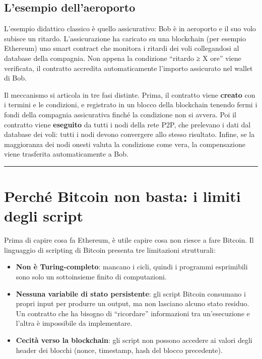 \documentclass[
  italian,
  openany]{book}
\providecommand{\tightlist}{%
  \setlength{\itemsep}{0pt}\setlength{\parskip}{0pt}}
\begin{document}
\subsection{L'esempio dell'aeroporto}\label{lesempio-dellaeroporto}

L'esempio didattico classico è quello assicurativo: Bob è in aeroporto e
il suo volo subisce un ritardo. L'assicurazione ha caricato su una
blockchain (per esempio Ethereum) uno smart contract che monitora i
ritardi dei voli collegandosi al database della compagnia. Non appena la
condizione ``ritardo ≥ X ore'' viene verificata, il contratto accredita
automaticamente l'importo assicurato nel wallet di Bob.

Il meccanismo si articola in tre fasi distinte. Prima, il contratto
viene \textbf{creato} con i termini e le condizioni, e registrato in un
blocco della blockchain tenendo fermi i fondi della compagnia
assicurativa finché la condizione non si avvera. Poi il contratto viene
\textbf{eseguito} da tutti i nodi della rete P2P, che prelevano i dati
dal database dei voli: tutti i nodi devono convergere allo stesso
risultato. Infine, se la maggioranza dei nodi onesti valuta la
condizione come vera, la compensazione viene trasferita automaticamente
a Bob.

\begin{center}\rule{0.5\linewidth}{0.5pt}\end{center}

\section{Perché Bitcoin non basta: i limiti degli
script}\label{perchuxe9-bitcoin-non-basta-i-limiti-degli-script}

Prima di capire cosa fa Ethereum, è utile capire cosa non riesce a fare
Bitcoin. Il linguaggio di scripting di Bitcoin presenta tre limitazioni
strutturali:

\begin{itemize}
\tightlist
\item
  \textbf{Non è Turing-completo}: mancano i cicli, quindi i programmi
  esprimibili sono solo un sottoinsieme finito di computazioni.
\item
  \textbf{Nessuna variabile di stato persistente}: gli script Bitcoin
  consumano i propri input per produrre un output, ma non lasciano
  alcuno stato residuo. Un contratto che ha bisogno di ``ricordare''
  informazioni tra un'esecuzione e l'altra è impossibile da
  implementare.
\item
  \textbf{Cecità verso la blockchain}: gli script non possono accedere
  ai valori degli header dei blocchi (nonce, timestamp, hash del blocco
  precedente).
\end{itemize}
\end{document}
